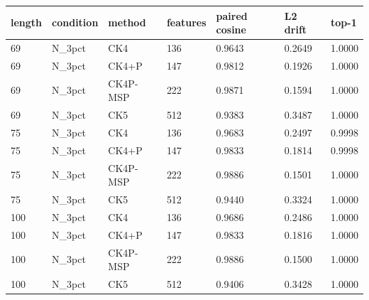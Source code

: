 \begin{tabular}{@{}p{}p{}p{}p{}p{}p{}p{}@{}}
\toprule
\textbf{length} & \textbf{condition} & \textbf{method} & \textbf{features} & \textbf{paired cosine} & \textbf{L2 drift} & \textbf{top-1} \\
\midrule
69 & N\_3pct & CK4 & 136 & 0.9643 & 0.2649 & 1.0000 \\
69 & N\_3pct & CK4+P & 147 & 0.9812 & 0.1926 & 1.0000 \\
69 & N\_3pct & CK4P-MSP & 222 & 0.9871 & 0.1594 & 1.0000 \\
69 & N\_3pct & CK5 & 512 & 0.9383 & 0.3487 & 1.0000 \\
75 & N\_3pct & CK4 & 136 & 0.9683 & 0.2497 & 0.9998 \\
75 & N\_3pct & CK4+P & 147 & 0.9833 & 0.1814 & 0.9998 \\
75 & N\_3pct & CK4P-MSP & 222 & 0.9886 & 0.1501 & 1.0000 \\
75 & N\_3pct & CK5 & 512 & 0.9440 & 0.3324 & 1.0000 \\
100 & N\_3pct & CK4 & 136 & 0.9686 & 0.2486 & 1.0000 \\
100 & N\_3pct & CK4+P & 147 & 0.9833 & 0.1816 & 1.0000 \\
100 & N\_3pct & CK4P-MSP & 222 & 0.9886 & 0.1500 & 1.0000 \\
100 & N\_3pct & CK5 & 512 & 0.9406 & 0.3428 & 1.0000 \\
\bottomrule
\end{tabular}
